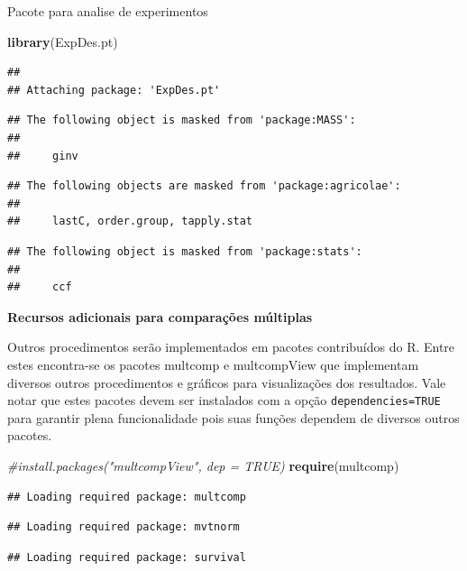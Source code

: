 \documentclass[
]{book}
\newenvironment{Shaded}{\begin{snugshade}}{\end{snugshade}}
\newcommand{\CommentTok}[1]{\textcolor[rgb]{0.56,0.35,0.01}{\textit{#1}}}
\newcommand{\KeywordTok}[1]{\textcolor[rgb]{0.13,0.29,0.53}{\textbf{#1}}}
\newcommand{\NormalTok}[1]{#1}
\begin{document}
Pacote para analise de experimentos

\begin{Shaded}
\begin{Highlighting}[]
\KeywordTok{library}\NormalTok{(ExpDes.pt)}
\end{Highlighting}
\end{Shaded}

\begin{verbatim}
## 
## Attaching package: 'ExpDes.pt'
\end{verbatim}

\begin{verbatim}
## The following object is masked from 'package:MASS':
## 
##     ginv
\end{verbatim}

\begin{verbatim}
## The following objects are masked from 'package:agricolae':
## 
##     lastC, order.group, tapply.stat
\end{verbatim}

\begin{verbatim}
## The following object is masked from 'package:stats':
## 
##     ccf
\end{verbatim}

\textbf{Recursos adicionais para comparações múltiplas}

Outros procedimentos serão implementados em pacotes contribuídos do R. Entre estes encontra-se os pacotes multcomp e multcompView que implementam diversos outros procedimentos e gráficos para visualizações dos resultados. Vale notar que estes pacotes devem ser instalados com a opção \texttt{dependencies=TRUE} para garantir plena funcionalidade pois suas funções dependem de diversos outros pacotes.

\begin{Shaded}
\begin{Highlighting}[]
\CommentTok{#install.packages("multcompView", dep = TRUE) }
\KeywordTok{require}\NormalTok{(multcomp) }
\end{Highlighting}
\end{Shaded}

\begin{verbatim}
## Loading required package: multcomp
\end{verbatim}

\begin{verbatim}
## Loading required package: mvtnorm
\end{verbatim}

\begin{verbatim}
## Loading required package: survival
\end{verbatim}
\end{document}
